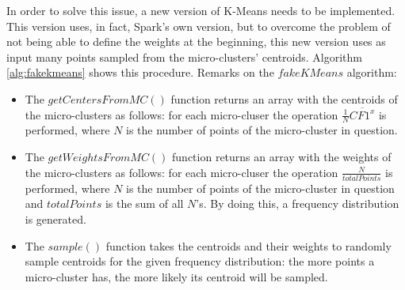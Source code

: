 In order to solve this issue, a new version of K-Means needs to be implemented. This version uses, in fact, Spark's own version, but to overcome the problem of not being able to define the weights at the beginning, this new version uses as input many points sampled from the micro-clusters' centroids. Algorithm \ref{alg:fakekmeans} shows this procedure.
Remarks on the $fakeKMeans$ algorithm:

\begin{itemize}
 \item The $getCentersFromMC()$ function returns an array with the centroids of the micro-clusters as follows: for each micro-cluser the operation $\frac{1}{N}\overline{CF1^x}$ is performed, where $N$ is the number of points of the micro-cluster in question.
 \item The $getWeightsFromMC()$ function returns an array with the weights of the micro-clusters as follows: for each micro-cluser the operation $\frac{N}{totalPoints}$ is performed, where $N$ is the number of points of the micro-cluster in question and $totalPoints$ is the sum of all $N$'s. By doing this, a frequency distribution is generated.
 \item The $sample()$ function takes the centroids and their weights to randomly sample centroids for the given frequency distribution: the more points a micro-cluster has, the more likely its centroid will be sampled.
 \end{itemize}
 
